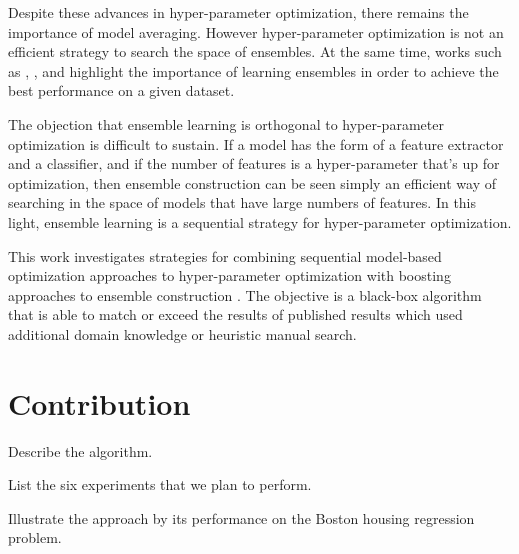 \documentclass[11pt,twocolumn]{article}
\begin{document}
\vspace{11pt}
Despite these advances in hyper-parameter optimization, there remains the 
importance of model averaging.
However hyper-parameter optimization is not an efficient strategy to search
the space of ensembles.
At the same time, works such as \citet{gehler}, \citet{coates+lee+ng:2010}, and \citet{fg11}
highlight the importance of learning ensembles in order to achieve the best performance
on a given dataset.

\vspace{11pt}
The objection that ensemble learning is orthogonal to hyper-parameter
optimization is difficult to sustain.
If a model has the form of a feature extractor and a classifier,
and if the number of features is a hyper-parameter that's up for optimization,
then ensemble construction can be seen simply an efficient way
of searching in the space of models that have large numbers of features.
In this light, ensemble learning is a sequential strategy for hyper-parameter
optimization.

\vspace{11pt}
This work investigates strategies for combining sequential model-based optimization
approaches to hyper-parameter optimization
with boosting approaches to ensemble construction \citep{mason,friedman}.
The objective is a black-box algorithm that is able to match or exceed the
results of published results which used additional domain knowledge or heuristic
manual search.

\section{Contribution}

Describe the algorithm.

List the six experiments that we plan to perform.

Illustrate the approach by its performance on the Boston housing regression problem.
\end{document}
